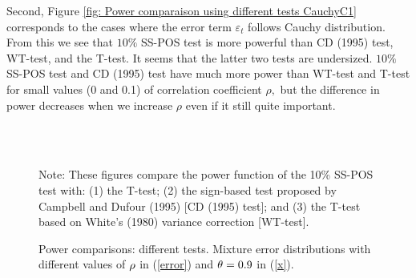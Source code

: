 \documentclass[harvard,11pt]{article}
\begin{document}
Second, Figure \ref{fig: Power comparaison using different tests CauchyC1}
corresponds to the cases where the error term $\varepsilon _{t}$ follows
Cauchy distribution. From this we see that $10\%$ SS-POS test is more
powerful than CD (1995) test, WT-test, and the T-test. It seems that the latter two
tests are undersized. $10\%$ SS-POS test and CD (1995) test have much more power
than WT-test and T-test for small values (0 and 0.1) of correlation
coefficient $\rho ,$ but the difference in power decreases when we increase $%
\rho $ even if it still quite important. 
\begin{figure}[tbph]
\caption{Power comparisons: different tests. Mixture error distributions
with different values of $\protect\rho $ in (\protect\ref{error}) and $%
\protect\theta =0.9$ in (\protect\ref{x}).}
\begin{center}
 \\[0pt]
\\[0pt]
\end{center}

Note: These figures compare the power
function of the 10\% SS-POS test with: (1) the T-test; (2) the sign-based test
proposed by Campbell and Dufour (1995) [CD (1995) test]; and (3) the T-test based
on White's (1980) variance correction [WT-test]. 
\label{fig: Power comparaison using different tests MixtureC1}
\end{figure}
\end{document}
